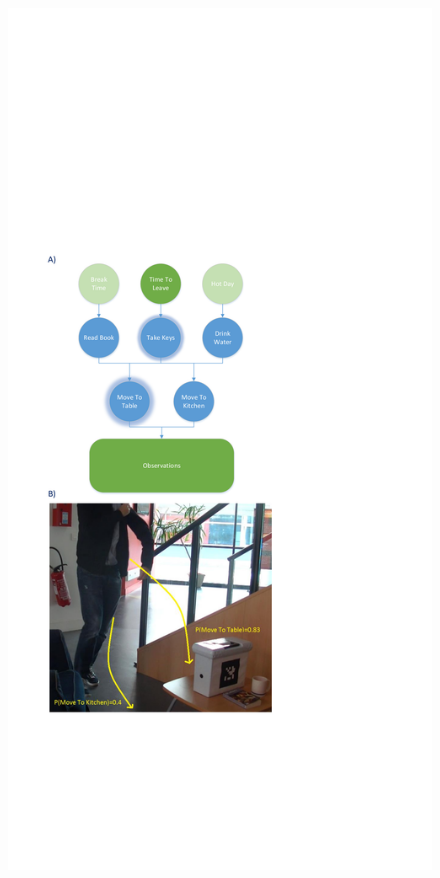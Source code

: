 \documentclass[a4paper,11pt,twoside]{StyleThese}
\begin{document}

\vspace{-10pt}

 \begin{figure}[h!]
	\centering
	\includegraphics[trim={2cm 11cm 11cm 17cm},clip,scale=0.56]{img/cookieScenario.pdf}

\end{figure}
\end{document}
